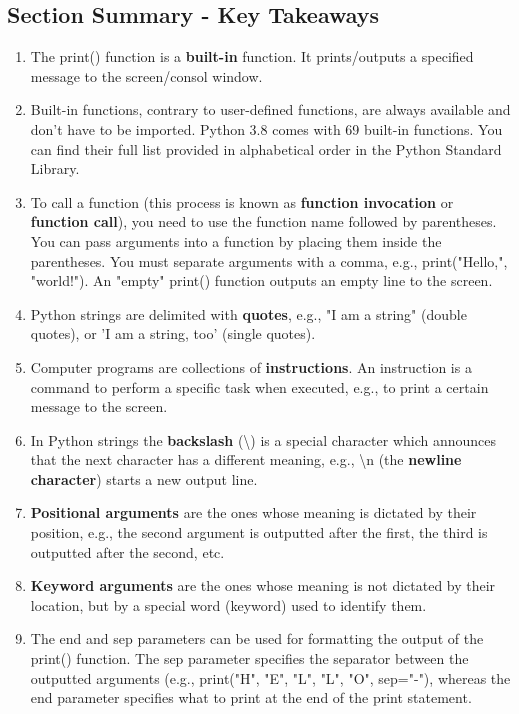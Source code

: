 \documentclass[a4paper,10pt]{article}
\begin{document}
\subsection{Section Summary - Key Takeaways}
\begin{enumerate}
 \item The {\selectfont print()} function is a \textbf{built-in} function. It prints/outputs a specified message to the screen/consol window.
 \item Built-in functions, contrary to user-defined functions, are always available and don't have to be imported. Python 3.8 comes with 69 built-in functions. You can find their full list provided in alphabetical order in the Python Standard Library.
 \item To call a function (this process is known as \textbf{function invocation} or \textbf{function call}), you need to use the function name followed by parentheses. You can pass arguments into a function by placing them inside the parentheses. You must separate arguments with a comma, e.g., {\selectfont print("Hello,", "world!")}. An "empty" {\selectfont print()} function outputs an empty line to the screen.
 \item Python strings are delimited with \textbf{quotes}, e.g., {\selectfont "I am a string"} (double quotes), or {\selectfont 'I am a string, too'} (single quotes).
 \item Computer programs are collections of \textbf{instructions}. An instruction is a command to perform a specific task when executed, e.g., to print a certain message to the screen.
  \item In Python strings the \textbf{backslash} (\textbackslash) is a special character which announces that the next character has a different meaning, e.g., \textbackslash n (the \textbf{newline character}) starts a new output line.
 \item \textbf{Positional arguments} are the ones whose meaning is dictated by their position, e.g., the second argument is outputted after the first, the third is outputted after the second, etc.
 \item \textbf{Keyword arguments} are the ones whose meaning is not dictated by their location, but by a special word (keyword) used to identify them.
 \item The {\selectfont end} and {\selectfont sep} parameters can be used for formatting the output of the {\selectfont print()} function. The sep parameter specifies the separator between the outputted arguments (e.g., {\selectfont print("H", "E", "L", "L", "O", sep="-")}, whereas the {\selectfont end} parameter specifies what to print at the end of the print statement.
\end{enumerate}
\end{document}
